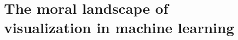 \section{The moral landscape of visualization in machine learning}\label{sec:ethics_machine_learning}

